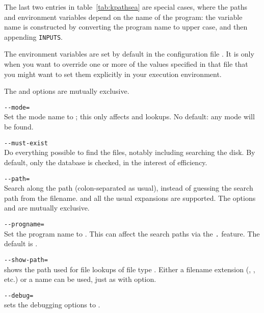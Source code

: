 \documentclass{article}
\begin{document}
\begin{multicols}{2}

  The last two entries in table~\ref{tab:kpathsea} are special
  cases, where the paths and environment variables depend on the name
  of the program: the variable name is constructed by converting the
  program name to upper case, and then appending \texttt{INPUTS}.
  
  The environment variables are set by default in the configuration
  file . It is only when you want to override one or
  more of the values specified in that file that you might want to set
  them explicitly in your execution environment.

  The  and  options are mutually
  exclusive.

\begin{ttdescription}

\item[\texttt{-{}-mode=\var{string}}]\mbox{}\\
  Set the mode name to ; this only affects 
  and  lookups.  No default: any mode will be found.
\item[\texttt{-{}-must-exist}]\mbox{}\\
  Do everything possible to find the files, notably including
  searching the disk.  By default, only the  database is
  checked, in the interest of efficiency.
\item[\texttt{-{}-path=\var{string}}]\mbox{}\\
  Search along the path  (colon-separated as usual),
  instead of guessing the search path from the filename.  \samp{//} and
  all the usual expansions are supported.  The options 
  and  are mutually exclusive.
\item[\texttt{-{}-progname=\var{name}}]\mbox{}\\
  Set the program name to \texttt{}.
  This can affect the search paths via the \texttt{.}
  feature.
  The default is .
\item[\texttt{-{}-show-path=\var{name}}]\mbox{}\\
  shows the path used for file lookups of file type \texttt{}.
  Either a filename extension (, , etc.) or a
  name can be used, just as with  option.
\item[\texttt{-{}-debug=\var{num}}]\mbox{}\\
  sets the debugging options to \texttt{}.
\end{ttdescription}



\end{multicols}
\end{document}
